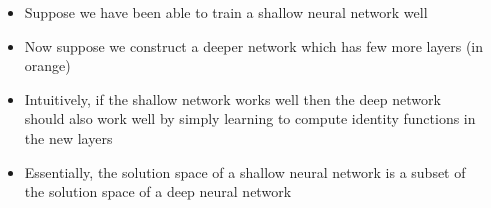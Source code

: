 \begin{frame}
\begin{columns}
\begin{overlayarea}{\textwidth}{\textheight}
{			}  
		\end{overlayarea}
		
		
		
		\begin{overlayarea}{\textwidth}{\textheight}
			\begin{itemize}
				\justifying
				\item<1-> Suppose we have been able to train a shallow neural network well
				\item<2-> Now suppose we construct a deeper network which has few more layers (in orange)
				\item<3-> Intuitively, if the shallow network works well then the deep network should also work well by simply learning to compute identity functions in the new layers
				\item<4-> Essentially, the solution space of a shallow neural network is a subset of the solution space of a deep neural network
			\end{itemize}
		\end{overlayarea}
	\end{columns}
\end{frame}



